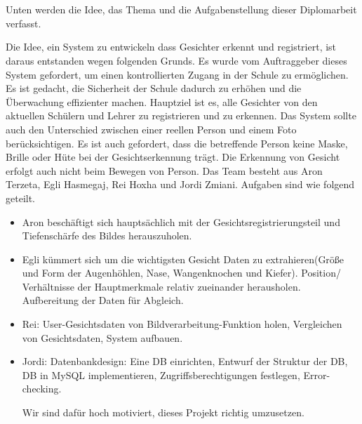 \chapter{\docname}
\label{\docname}

\color{black}
Unten werden die Idee, das Thema und die Aufgabenstellung dieser Diplomarbeit verfasst.
\begin{flushleft}
Die Idee, ein System zu entwickeln dass Gesichter erkennt und registriert, ist daraus entstanden wegen folgenden Grunds. 
Es wurde vom Auftraggeber dieses System gefordert, um einen kontrollierten Zugang in der Schule zu ermöglichen. Es ist gedacht, die Sicherheit der Schule dadurch zu erhöhen und die Überwachung effizienter machen. 
Hauptziel ist es, alle Gesichter von den aktuellen Schülern und Lehrer zu registrieren und zu erkennen. 
Das System sollte auch den Unterschied zwischen einer reellen Person und einem Foto berücksichtigen.  Es ist auch gefordert, dass die betreffende Person keine Maske, Brille oder Hüte bei der Gesichtserkennung trägt. Die Erkennung von Gesicht erfolgt auch nicht beim Bewegen von Person.
Das Team besteht aus Aron Terzeta, Egli Hasmegaj, Rei Hoxha und Jordi Zmiani. 
Aufgaben sind wie folgend geteilt. 
\end{flushleft}
\begin{itemize}
	 
	
	
	\item Aron beschäftigt sich hauptsächlich mit der Gesichtsregistrierungsteil und Tiefenschärfe des Bildes herauszuholen. 
	\item Egli kümmert sich um die wichtigsten Gesicht Daten zu extrahieren(Größe und Form der Augenhöhlen, Nase, Wangenknochen und Kiefer). Position/ Verhältnisse der Hauptmerkmale relativ zueinander herausholen.  Aufbereitung der Daten für Abgleich.
	\item Rei: User-Gesichtsdaten von Bildverarbeitung-Funktion holen, Vergleichen von Gesichtsdaten, System aufbauen.
	\item Jordi: Datenbankdesign: Eine DB einrichten, Entwurf der Struktur der DB, DB in MySQL implementieren, Zugriffsberechtigungen festlegen, Error-checking. 
	
	
	 Wir sind dafür hoch motiviert, dieses Projekt richtig umzusetzen.
	
\end{itemize}

\color{black}
